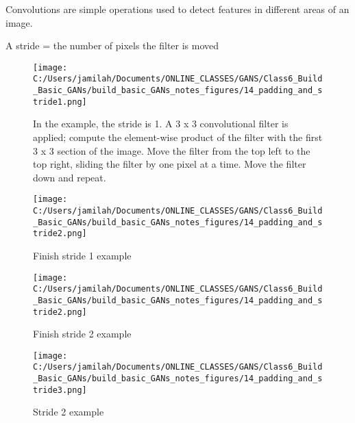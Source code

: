 \documentclass[11pt, onecolumn]{article}
\begin{document}
Convolutions are simple operations used to detect features in different areas of an image.

A stride = the number of pixels the filter is moved

\begin{figure}[htp]
\begin{center}
\texttt{[image: C:/Users/jamilah/Documents/ONLINE\_CLASSES/GANS/Class6\_Build\_Basic\_GANs/build\_basic\_GANs\_notes\_figures/14\_padding\_and\_stride1.png]}
\end{center}
\caption{In the example, the stride is 1.  A 3 x 3 convolutional filter is applied; compute the element-wise product of the filter with the first 3 x 3 section of the image. Move the filter from the top left to the top right, sliding the filter by one pixel at a time. Move the filter down and repeat.}
\label{14_padding_and_stride1}
\end{figure}

\begin{figure}[htp]
\begin{center}
\texttt{[image: C:/Users/jamilah/Documents/ONLINE\_CLASSES/GANS/Class6\_Build\_Basic\_GANs/build\_basic\_GANs\_notes\_figures/14\_padding\_and\_stride2.png]}
\end{center}
\caption{Finish stride 1 example}
\label{14_padding_and_stride2}
\end{figure}

\begin{figure}[htp]
\begin{center}
\texttt{[image: C:/Users/jamilah/Documents/ONLINE\_CLASSES/GANS/Class6\_Build\_Basic\_GANs/build\_basic\_GANs\_notes\_figures/14\_padding\_and\_stride2.png]}
\end{center}
\caption{Finish stride 2 example}
\label{14_padding_and_stride2}
\end{figure}

\begin{figure}[htp]
\begin{center}
\texttt{[image: C:/Users/jamilah/Documents/ONLINE\_CLASSES/GANS/Class6\_Build\_Basic\_GANs/build\_basic\_GANs\_notes\_figures/14\_padding\_and\_stride3.png]}
\end{center}
\caption{Stride 2 example}
\label{14_padding_and_stride3}
\end{figure}
\end{document}
